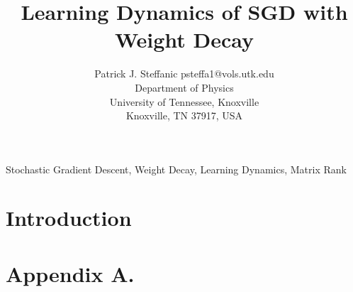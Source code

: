 \documentclass[twoside,11pt]{article}
\begin{document}
\title{Learning Dynamics of SGD with Weight Decay}

\author{\name Patrick J. Steffanic \email psteffa1@vols.utk.edu \\
       \addr Department of Physics\\
       University of Tennessee, Knoxville\\
       Knoxville, TN 37917, USA}

\editor{}

\maketitle

\begin{abstract}%
\cite{zhang2018three} 
\end{abstract}

\begin{keywords}
    Stochastic Gradient Descent, Weight Decay, Learning Dynamics, Matrix Rank
\end{keywords}

\section{Introduction}


\acks{}


\newpage

\appendix
\section*{Appendix A.}
\label{app:theorem}



\vskip 0.2in

\end{document}

